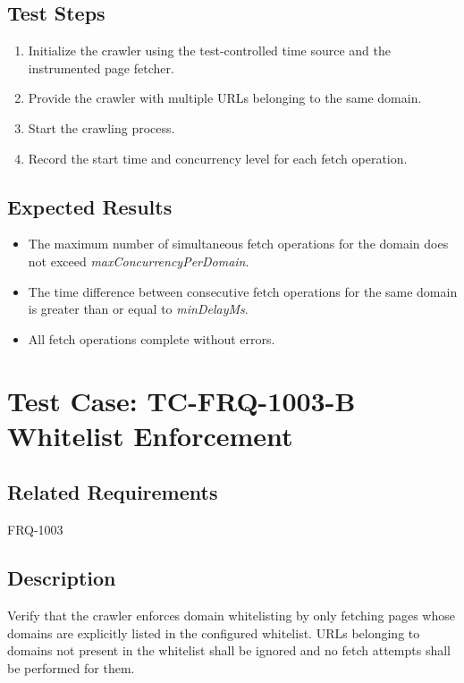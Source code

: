 \documentclass{article}
\begin{document}
\subsection*{Test Steps}
\begin{enumerate}
  \item Initialize the crawler using the test-controlled time source and the instrumented page fetcher.
  \item Provide the crawler with multiple URLs belonging to the same domain.
  \item Start the crawling process.
  \item Record the start time and concurrency level for each fetch operation.
\end{enumerate}


\subsection*{Expected Results}
\begin{itemize}
  \item The maximum number of simultaneous fetch operations for the domain does not exceed 
        \textit{maxConcurrencyPerDomain}.
  \item The time difference between consecutive fetch operations for the same domain is greater than or equal to 
        \textit{minDelayMs}.
  \item All fetch operations complete without errors.
\end{itemize}

\section{Test Case: TC-FRQ-1003-B \newline Whitelist Enforcement}

\subsection*{Related Requirements}
FRQ-1003

\subsection*{Description}
Verify that the crawler enforces domain whitelisting by only fetching pages whose domains 
are explicitly listed in the configured whitelist. URLs belonging to domains not present 
in the whitelist shall be ignored and no fetch attempts shall be performed for them.
\end{document}
